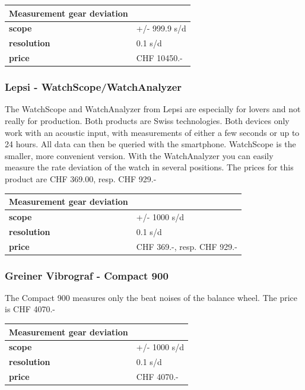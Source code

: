 \documentclass[12pt, a4paper]{report}
\begin{document}
    \begin{tabularx}{\textwidth}{>{\bfseries}lX}
    Measurement gear deviation & \\\toprule
    scope & +/- 999.9 s/d \\\midrule
    resolution & 0.1 s/d\\\midrule
    price & CHF 10450.-\\\bottomrule
    \end{tabularx}
    
    \subsubsection{Lepsi - WatchScope/WatchAnalyzer}
    The WatchScope and WatchAnalyzer from Lepsi are especially for lovers and not really for production. Both products are Swiss technologies. Both devices only work with an acoustic input, with measurements of either a few seconds or up to 24 hours. All data can then be queried with the smartphone. WatchScope is the smaller, more convenient version. With the WatchAnalyzer you can easily measure the rate deviation of the watch in several positions. The prices for this product are CHF 369.00, resp. CHF 929.-
    
    \bigskip
    
    \begin{tabularx}{\textwidth}{>{\bfseries}lX}
    Measurement gear deviation & \\\toprule
    scope & +/- 1000 s/d \\\midrule
    resolution & 0.1 s/d\\\midrule
    price & CHF 369.-, resp. CHF 929.-\\\bottomrule
    \end{tabularx}
    
    
    \subsubsection{Greiner Vibrograf - Compact 900}
    The Compact 900 measures only the beat noises of the balance wheel. The price is CHF 4070.-
    
    \bigskip
    
    \begin{tabularx}{\textwidth}{>{\bfseries}lX}
    Measurement gear deviation & \\\toprule
    scope & +/- 1000 s/d \\\midrule
    resolution & 0.1 s/d\\\midrule
    price & CHF 4070.-\\\bottomrule
    \end{tabularx}
    
\end{document}
